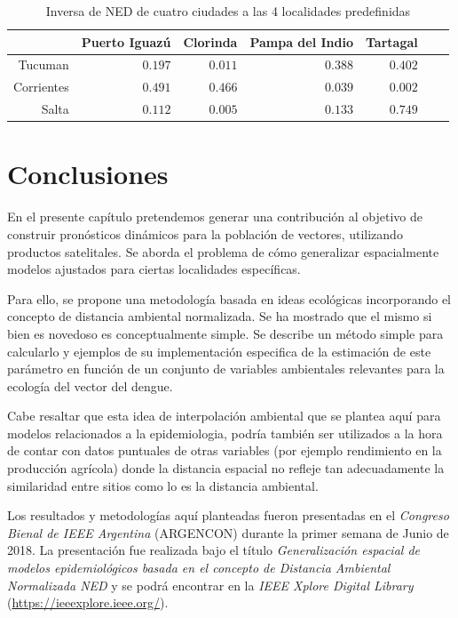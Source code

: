     \begin{table}[hbt]
    \centering
    \caption{Inversa de NED de cuatro ciudades a las 4 localidades predefinidas}\label{Tab:comparacion_ned}
    \begin{tabular}{*7{r}}
    \toprule
    & Puerto Iguazú
    & Clorinda
    & Pampa del Indio
    & Tartagal \\ \midrule
    Tucuman
    &$0.197$
    &$0.011$
    &$0.388$%
    &$0.402$\\
    Corrientes
    &$0.491$
    &$0.466$
    &$0.039$
    &$0.002$ \\
    Salta
    &$0.112$
    &$0.005$
    &$0.133$   %
    &$0.749$ \\
    \bottomrule
    \end{tabular}
    \end{table}

\section{Conclusiones}
  \par En el presente capítulo pretendemos generar una contribución al objetivo de
    construir pronósticos dinámicos para la población de vectores,
    utilizando productos satelitales. Se aborda el problema de cómo generalizar
    espacialmente modelos ajustados para ciertas localidades específicas.

  \par Para ello, se propone una metodología basada en ideas ecológicas
    incorporando el concepto de distancia ambiental normalizada.
    Se ha mostrado que el mismo si bien es novedoso es conceptualmente simple.
    Se describe un método simple para calcularlo y ejemplos de su
    implementación especifica de la estimación de este parámetro en
    función de un conjunto de variables ambientales relevantes para la
    ecología del vector del dengue.

  \par Cabe resaltar que esta idea de interpolación ambiental que se
    plantea aquí para modelos relacionados a la epidemiologia,
    podría también ser utilizados a la hora de contar con datos
    puntuales de otras variables (por ejemplo rendimiento en la producción
    agrícola) donde la distancia espacial no refleje tan adecuadamente la
    similaridad entre sitios como lo es la distancia ambiental.


  \par Los resultados y metodologías aquí planteadas fueron presentadas en el
    \textit{Congreso Bienal de IEEE Argentina} (ARGENCON) durante la primer semana de Junio
    de 2018. La presentación fue realizada bajo el título
    \textit{Generalización espacial de modelos epidemiológicos basada en el
    concepto de Distancia Ambiental Normalizada NED} y 
    se podrá encontrar
    en la \textit{IEEE Xplore Digital Library} (\url{https://ieeexplore.ieee.org/}).

